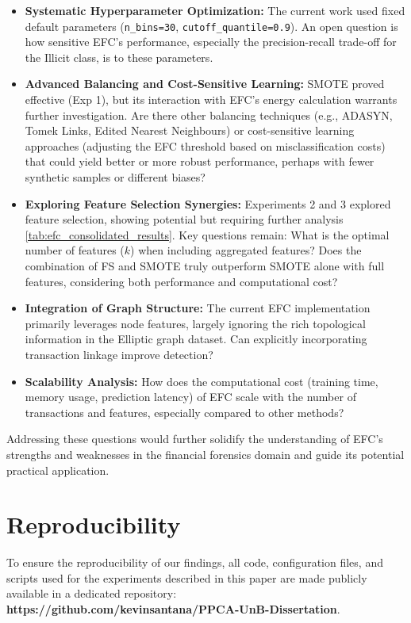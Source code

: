 \documentclass[12pt]{article}
\begin{document}
\begin{itemize}
    \item \textbf{Systematic Hyperparameter Optimization:} The current work used fixed default parameters (\texttt{n\_bins=30},
    \texttt{cutoff\_quantile=0.9}). An open question is how sensitive EFC's performance, especially the precision-recall
    trade-off for the Illicit class, is to these parameters.

    \item \textbf{Advanced Balancing and Cost-Sensitive Learning:} SMOTE proved effective (Exp 1), but its interaction with
    EFC's energy calculation warrants further investigation. Are there other balancing techniques (e.g., ADASYN, Tomek Links,
    Edited Nearest Neighbours) or cost-sensitive learning approaches (adjusting the EFC threshold based on misclassification
    costs) that could yield better or more robust performance, perhaps with fewer synthetic samples or different biases?

    \item \textbf{Exploring Feature Selection Synergies:} Experiments 2 and 3 explored feature selection, showing potential
    but requiring further analysis \ref{tab:efc_consolidated_results}. Key questions remain: What
    is the optimal number of features ($k$) when including aggregated features? Does the combination of FS and SMOTE truly
    outperform SMOTE alone with full features, considering both performance and computational cost?

    \item \textbf{Integration of Graph Structure:} The current EFC implementation primarily leverages node features,
    largely ignoring the rich topological information in the Elliptic graph dataset. Can explicitly incorporating transaction
    linkage improve detection?

    \item \textbf{Scalability Analysis:} How does the computational cost (training time, memory usage, prediction latency)
    of EFC scale with the number of transactions and features, especially compared to other methods?
\end{itemize}

Addressing these questions would further solidify the understanding of EFC's strengths and weaknesses in the financial
forensics domain and guide its potential practical application.


\section{Reproducibility} \label{sec:reproducibility}
To ensure the reproducibility of our findings, all code, configuration files, and scripts used for the experiments described
in this paper are made publicly available in a dedicated repository: \textbf{https://github.com/kevinsantana/PPCA-UnB-Dissertation}.
\end{document}
